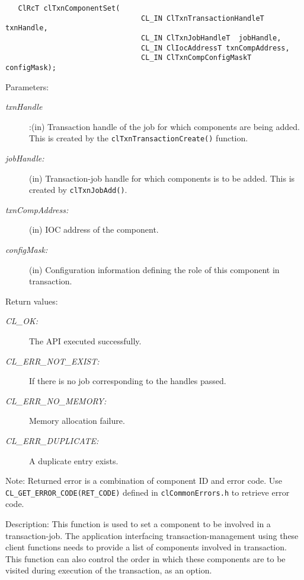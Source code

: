 \begin{flushleft}
\begin{Desc}
\footnotesize\begin{verbatim}   ClRcT clTxnComponentSet(
                       			CL_IN ClTxnTransactionHandleT  txnHandle,
                       			CL_IN ClTxnJobHandleT  jobHandle,
                       			CL_IN ClIocAddressT txnCompAddress,
                       			CL_IN ClTxnCompConfigMaskT  configMask);
\end{verbatim}
\normalsize
\end{Desc}
\begin{Desc}
\item[Parameters:]
\begin{description}
\item[{\em txn\-Handle}]:(in) Transaction handle of the job for which components are being added. This is created by the {\tt{clTxnTransactionCreate()}} function.
\item[{\em job\-Handle:}](in) Transaction-job handle for which components is to be added. This is created by {\tt{clTxnJobAdd()}}. 
\item[{\em txn\-Comp\-Address:}](in) IOC address of the component. 
\item[{\em config\-Mask:}](in) Configuration information defining the role of this component in
transaction.\end{description}
\end{Desc}
\begin{Desc}
\item[Return values:]
\begin{description}
\item[{\em CL\_\-OK:}]The API executed successfully. \item[{\em CL\_\-ERR\_\-NOT\_\-EXIST:}]If there is no job corresponding to the handles passed. 
\item[{\em CL\_\-ERR\_\-NO\_\-MEMORY:}]Memory allocation failure. \item[{\em CL\_\-ERR\_\-DUPLICATE:}]A duplicate entry exists.\end{description}
\end{Desc}
\begin{Desc}
\item[Note:]Returned error is a combination of component ID and error code. Use {\tt{CL\_\-GET\_\-ERROR\_\-CODE(RET\_\-CODE)}} defined in 
{\tt{clCommonErrors.h}} to retrieve error code.\end{Desc}
\begin{Desc}
\item[Description:]This function is used to set a component to be involved in a transaction-job. The application interfacing transaction-management using 
these client functions needs to provide a list of components involved in transaction. This function can also control the order in which these 
components are to be visited during execution of the transaction, as an option.


\end{Desc}
\end{flushleft}
